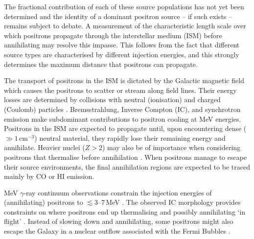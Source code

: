 \documentclass[doublespace,draft,nopageskip]{VTthesis} %
\begin{document}
	
	The fractional contribution of each of these source populations has not yet been determined and the identity of a dominant positron source -- if such exists -- remains subject to debate.
	A measurement of the characteristic length scale over which positrons propagate through the interstellar medium (ISM) before annihilating may resolve this impasse.
	This follows from the fact that different source types are characterised by different injection energies, and this strongly determines the maximum distance that positrons can propagate.
	
	
	The transport of positrons in the ISM is dictated by the Galactic magnetic field which causes the positrons to scatter or stream along field lines.
	Their energy losses are determined by collisions with neutral (ionisation) and charged (Coulomb) particles \citep{Jean2009_511ISM,Martin2012_511,Alexis2014_511ISM,Panther2018_nuclear_outflow}. 
	Bremsstrahlung, Inverse Compton (IC), and synchrotron emission make subdominant contributions to positron cooling at MeV energies.
	Positrons in the ISM are expected to propagate until, upon encountering dense ($\gg 1\,\mathrm{cm^{-3}}$) neutral material, they rapidly lose their remaining energy and annihilate.
	Heavier nuclei ($Z > 2$) may also be of importance when considering positrons that thermalise before annihilation \citep{Panther2018_alkali511}.
	When positrons manage to escape their source environments, the final annihilation regions are expected to be traced mainly by CO or HI emission.
	
	MeV $\gamma$-ray continuum observations \citep{Strong2005_gammaconti,Strong2010_CR_luminosity} constrain the injection energies of (annihilating) positrons to $\lesssim 3$--$7$\,MeV \citep{Sizun2006_511,Beacom2006_511}.
	The observed IC morphology provides constraints on where positrons end up thermalising and possibly annihilating `in flight' \citep[e.g.,][]{Aharonyan1981_511}.
	Instead of slowing down and annihilating, some positrons might also escape the Galaxy in a nuclear outflow associated with the Fermi Bubbles \citep[FB;][]{Su2010_fermibubbles,Crocker2011_FB}.
	
\end{document}
